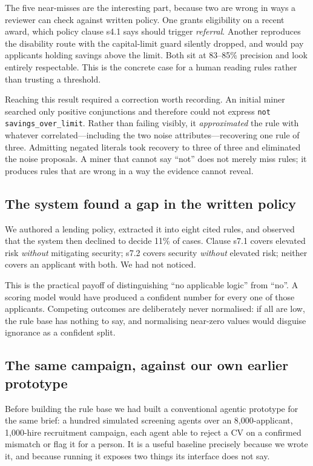 \documentclass[sigconf,nonacm]{acmart}
\begin{document}
The five near-misses are the interesting part, because two are wrong in ways a
reviewer can check against written policy. One grants eligibility on a recent
award, which policy clause s4.1 says should trigger \emph{referral}. Another
reproduces the disability route with the capital-limit guard silently dropped,
and would pay applicants holding savings above the limit. Both sit at 83--85\%
precision and look entirely respectable. This is the concrete case for a human
reading rules rather than trusting a threshold.

Reaching this result required a correction worth recording. An initial miner
searched only positive conjunctions and therefore could not express
\lstinline|not savings_over_limit|. Rather than failing visibly, it
\emph{approximated} the rule with whatever correlated---including the two noise
attributes---recovering one rule of three. Admitting negated literals took
recovery to three of three and eliminated the noise proposals. A miner that
cannot say ``not'' does not merely miss rules; it produces rules that are wrong
in a way the evidence cannot reveal.

\subsection{The system found a gap in the written policy}

We authored a lending policy, extracted it into eight cited rules, and observed
that the system then declined to decide 11\% of cases. Clause s7.1 covers
elevated risk \emph{without} mitigating security; s7.2 covers security
\emph{without} elevated risk; neither covers an applicant with both. We had not
noticed.

This is the practical payoff of distinguishing ``no applicable logic'' from
``no''. A scoring model would have produced a confident number for every one of
those applicants. Competing outcomes are deliberately never normalised: if all
are low, the rule base has nothing to say, and normalising near-zero values
would disguise ignorance as a confident split.

\subsection{The same campaign, against our own earlier prototype}
\label{sec:recruitment}

Before building the rule base we had built a conventional agentic prototype for
the same brief: a hundred simulated screening agents over an 8{,}000-applicant,
1{,}000-hire recruitment campaign, each agent able to reject a CV on a confirmed
mismatch or flag it for a person. It is a useful baseline precisely because we
wrote it, and because running it exposes two things its interface does not say.
\end{document}
